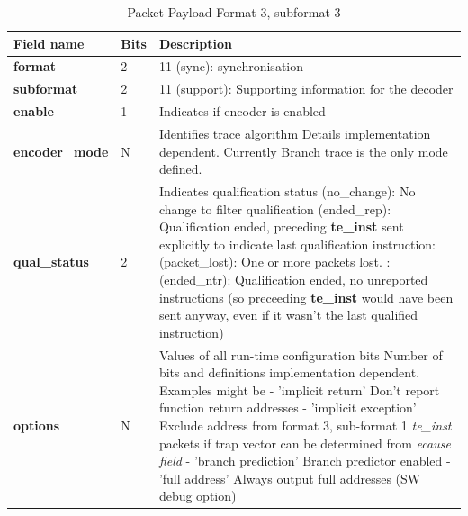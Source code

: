 \begin{table}[htp]
  \centering
  \caption{Packet Payload Format 3, subformat 3}
  \label{tab:te_inst3}
  \begin{tabulary}{\textwidth}{|l|p{35mm}|p{80mm}|}
    \hline
     {\bf Field name} & {\bf Bits} & {\bf Description} \\
     \hline
     \textbf{format} & 2 & 11 (sync): synchronisation\\
     \hline
     \textbf{subformat}  & 2 & 11 (support): Supporting information for the decoder \\
     \hline
     \textbf{enable} & 1 & Indicates if encoder is enabled\\
     \hline
     \textbf{encoder\_mode} & N & Identifies trace algorithm\newline
       Details implementation dependent.  Currently Branch trace is the only mode defined.\\
     \hline
     \textbf{qual\_status} & 2 & Indicates qualification status (no\_change): No change to filter qualification  (ended\_rep): Qualification ended, preceding \textbf{te\_inst} sent explicitly to indicate last qualification instruction: (packet\_lost): One or more packets lost. : (ended\_ntr): Qualification ended, no unreported instructions (so preceeding \textbf{te\_inst} would have been sent anyway, even if it wasn't the last qualified instruction)\\
     \hline
     \textbf{options} & N & Values of all run-time configuration bits\newline
       Number of bits and definitions implementation dependent.  Examples might be\newline
       - 'implicit return' Don't report function return addresses \newline
       - 'implicit exception' Exclude address from format 3, sub-format 1 \textit{te\_inst} packets if trap vector can be determined from \textit{ecause field}\newline
       - 'branch prediction' Branch predictor enabled\newline
       - 'full address' Always output full addresses (SW debug option)\\
       \hline
  \end{tabulary}
\end{table}

